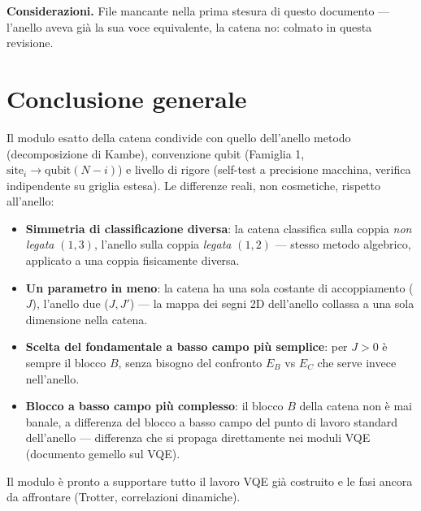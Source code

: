 \documentclass[11pt,a4paper]{article}
\begin{document}
\textbf{Considerazioni.} File mancante nella prima stesura di questo documento —
l'anello aveva già la sua voce equivalente, la catena no: colmato in questa
revisione.

\section*{Conclusione generale}

Il modulo esatto della catena condivide con quello dell'anello metodo (decomposizione
di Kambe), convenzione qubit (Famiglia 1, $\text{site}_i\to\text{qubit}(N-i)$) e
livello di rigore (self-test a precisione macchina, verifica indipendente su griglia
estesa). Le differenze reali, non cosmetiche, rispetto all'anello:

\begin{itemize}
\item \textbf{Simmetria di classificazione diversa}: la catena classifica sulla coppia
\emph{non legata} $(1,3)$, l'anello sulla coppia \emph{legata} $(1,2)$ — stesso metodo
algebrico, applicato a una coppia fisicamente diversa.
\item \textbf{Un parametro in meno}: la catena ha una sola costante di accoppiamento
($J$), l'anello due ($J,J'$) — la mappa dei segni 2D dell'anello collassa a una sola
dimensione nella catena.
\item \textbf{Scelta del fondamentale a basso campo più semplice}: per $J>0$ è sempre
il blocco $B$, senza bisogno del confronto $E_B$ vs $E_C$ che serve invece
nell'anello.
\item \textbf{Blocco a basso campo più complesso}: il blocco $B$ della catena non è
mai banale, a differenza del blocco a basso campo del punto di lavoro standard
dell'anello — differenza che si propaga direttamente nei moduli VQE (documento
gemello sul VQE).
\end{itemize}

Il modulo è pronto a supportare tutto il lavoro VQE già costruito e le fasi ancora da
affrontare (Trotter, correlazioni dinamiche).
\end{document}

